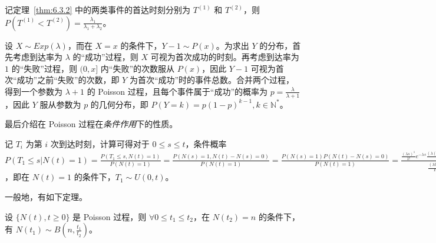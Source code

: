 \documentclass[../main.tex]{subfiles}
\begin{document}
\begin{theorem}\label{thm:6.3.3}
    记定理~\ref{thm:6.3.2} 中的两类事件的首达时刻分别为 $T^{(1)}$ 和 $T^{(2)}$，则 $P(T^{(1)}<T^{(2)})=\frac{\lambda_1}{\lambda_1+\lambda_2}$。
\end{theorem}

\begin{example}
    设 $X\sim Exp(\lambda)$，而在 $X=x$ 的条件下，$Y-1\sim P(x)$。为求出 $Y$ 的分布，首先考虑到达率为 $\lambda$ 的“成功”过程，则 $X$ 可视为首次成功的时刻。再考虑到达率为 $1$ 的“失败”过程，则 $(0,x]$ 内“失败”的次数服从 $P(x)$，因此 $Y-1$ 可视为首次“成功”之前“失败”的次数，即 $Y$ 为首次“成功”时的事件总数。合并两个过程，得到一个参数为 $\lambda+1$ 的 Poisson 过程，且每个事件属于“成功”的概率为 $p=\frac{\lambda}{\lambda+1}$，因此 $Y$ 服从参数为 $p$ 的几何分布，即 $P(Y=k)=p(1-p)^{k-1},k\in\mathbb N^*$。
\end{example}

最后介绍在 Poisson 过程在\emph{条件作用}下的性质。

记 $T_i$ 为第 $i$ 次到达时刻，计算可得对于 $0\leq s\leq t$，条件概率 $P(T_1\leq s|N(t)=1)=\frac{P(T_1\leq s,N(t)=1)}{P(N(t)=1)}=\frac{P(N(s)=1,N(t)-N(s)=0)}{P(N(t)=1)}=\frac{P(N(s)=1)P(N(t)-N(s)=0)}{P(N(t)=1)}=\frac{\frac{(\lambda s)^1}{1!}e^{-\lambda s}\frac{(\lambda(t-s))^0}{0!}e^{-\lambda(t-s)}}{\frac{(\lambda t)^1}{1!}e^{-\lambda t}}=\frac st$，即在 $N(t)=1$ 的条件下，$T_1\sim U(0,t)$。

一般地，有如下定理。

\begin{theorem}\label{thm:6.3.4}
    设 $\{N(t),t\geq0\}$ 是 Poisson 过程，则 $\forall 0\leq t_1\leq t_2$，在 $N(t_2)=n$ 的条件下，有 $N(t_1)\sim B(n,\frac{t_1}{t_2})$。
\end{theorem}
\end{document}
